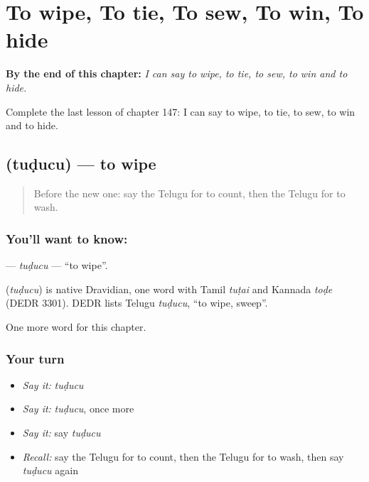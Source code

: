 
\chapter{To wipe, To tie, To sew, To win, To hide}
\label{ch:te-to-wipe-to-tie-to-sew-to-win-to-hide}

\begin{chapteropening}
\textbf{By the end of this chapter:} \emph{I can say to wipe, to tie, to sew, to win and to hide.}

Complete the last lesson of chapter 147: I can say to wipe, to tie, to sew, to win and to hide.
\end{chapteropening}

\section[\texorpdfstring{\te{తుడుచు} (tuḍucu)}{తుడుచు (tuḍucu)}]{ (tuḍucu) — to wipe}

\label{lesson:TE-C147-tuducu}



\begin{quote}
Before the new one: say the Telugu for to count, then the Telugu for to wash.
\end{quote}

\subsection*{You'll want to know: }
\textbf{} — \emph{tuḍucu} — \textquotedblleft{}to wipe\textquotedblright{}.

\begin{cousinweb}
\textbf{} (\emph{tuḍucu}) is native Dravidian, one word with Tamil \emph{tuṭai} and Kannada \emph{toḍe} (DEDR 3301). DEDR lists Telugu \emph{tuḍucu}, \textquotedblleft{}to wipe, sweep\textquotedblright{}.
\end{cousinweb}

\begin{grammarlens}[title={What you've built}]
One more word for this chapter.
\end{grammarlens}

\subsection*{Your turn}
\begin{itemize}
\raggedright
  \item \emph{Say it:} \emph{tuḍucu}
  \item \emph{Say it:} \emph{tuḍucu}, once more
  \item \emph{Say it:} say \emph{tuḍucu}
  \item \emph{Recall:} say the Telugu for to count, then the Telugu for to wash, then say \emph{tuḍucu} again
\end{itemize}

